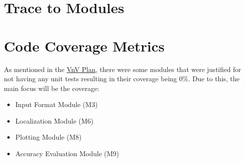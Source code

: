 \documentclass[12pt, titlepage]{article}
\begin{document}
\section{Trace to Modules}	
\begin{table}[H]
  \centering
  \caption{Tracibility Matrix Between the Test Cases \& Modules}
  \end{table}	

\section{Code Coverage Metrics}

As mentioned in the \href{https://github.com/AliyahJimoh/2D-Localizer/blob/main/docs/VnVPlan/VnVPlan.pdf}{VnV Plan}, there were some modules that were justified for not having any unit tests resulting in their coverage being 0\%. Due to this, the main focus will be the coverage:
\begin{itemize}
  \item Input Format Module (M3)
  \item Localization Module (M6)
  \item Plotting Module (M8)
  \item Accuracy Evaluation Module (M9)
\end{itemize}
\end{document}
